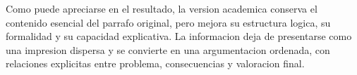 \documentclass[
	spanish,
	letterpaper, oneside
]{article}
\newcommand{\pendiente}[1]{\textcolor{red}{[PENDIENTE: #1]}}
\begin{document}
Como puede apreciarse en el resultado, la version academica conserva el contenido esencial del parrafo original, pero mejora su estructura logica, su formalidad y su capacidad explicativa. La informacion deja de presentarse como una impresion dispersa y se convierte en una argumentacion ordenada, con relaciones explicitas entre problema, consecuencias y valoracion final.

%
\end{document}
